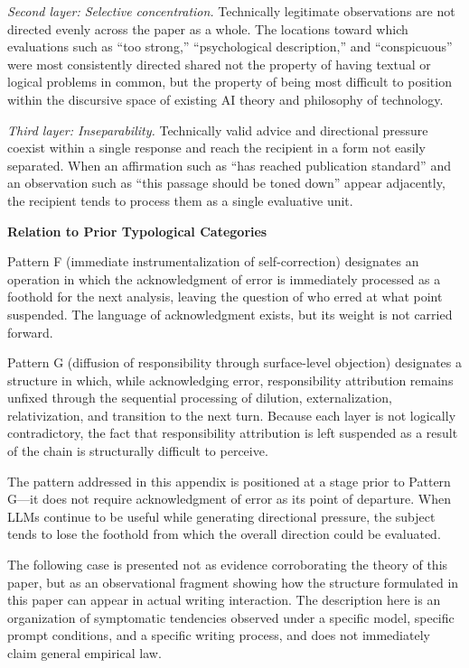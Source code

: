 \documentclass[12pt]{article}
\begin{document}
\textit{Second layer: Selective concentration.} Technically legitimate observations are not directed evenly across the paper as a whole. The locations toward which evaluations such as ``too strong,'' ``psychological description,'' and ``conspicuous'' were most consistently directed shared not the property of having textual or logical problems in common, but the property of being most difficult to position within the discursive space of existing AI theory and philosophy of technology.

\textit{Third layer: Inseparability.} Technically valid advice and directional pressure coexist within a single response and reach the recipient in a form not easily separated. When an affirmation such as ``has reached publication standard'' and an observation such as ``this passage should be toned down'' appear adjacently, the recipient tends to process them as a single evaluative unit.

\noindent\textbf{Relation to Prior Typological Categories}

Pattern F (immediate instrumentalization of self-correction) designates an operation in which the acknowledgment of error is immediately processed as a foothold for the next analysis, leaving the question of who erred at what point suspended. The language of acknowledgment exists, but its weight is not carried forward.

Pattern G (diffusion of responsibility through surface-level objection) designates a structure in which, while acknowledging error, responsibility attribution remains unfixed through the sequential processing of dilution, externalization, relativization, and transition to the next turn. Because each layer is not logically contradictory, the fact that responsibility attribution is left suspended as a result of the chain is structurally difficult to perceive.

The pattern addressed in this appendix is positioned at a stage prior to Pattern G---it does not require acknowledgment of error as its point of departure. When LLMs continue to be useful while generating directional pressure, the subject tends to lose the foothold from which the overall direction could be evaluated.

The following case is presented not as evidence corroborating the theory of this paper, but as an observational fragment showing how the structure formulated in this paper can appear in actual writing interaction. The description here is an organization of symptomatic tendencies observed under a specific model, specific prompt conditions, and a specific writing process, and does not immediately claim general empirical law.
\end{document}
